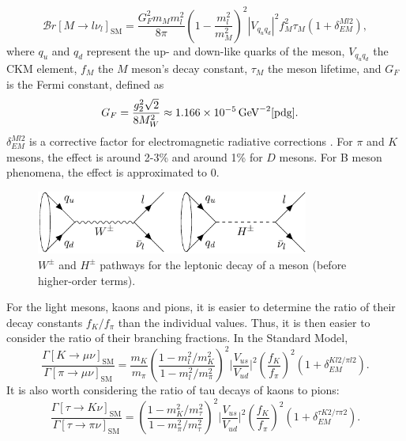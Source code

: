 \documentclass[a4paper,12pt]{article}
\begin{document}
\begin{equation}
    \label{eq:mlv}
    \mathcal{B}r[M\to l\nu_l]_{\text{SM}} = \frac{G_F^2m_Mm_l^2}{8\pi}\left(1-\frac{m_l^2}{m_M^2}\right)^2 |V_{q_uq_d}|^2f_M^2\tau_M(1+\delta_{EM}^{Ml2}),
\end{equation}
where $q_u$ and $q_d$ represent the up- and down-like quarks of the meson, $V_{q_uq_d}$ the CKM element, $f_M$ the $M$ meson's decay constant, $\tau_M$ the meson lifetime, and $G_F$ is the Fermi constant, defined as
\begin{align}
    G_F &= \frac{g_2^2\sqrt{2}}{8M_W^2} \approx 1.166\times10^{-5}\,\text{GeV}^{-2} \cite{pdg}.
\end{align}
$\delta_{EM}^{Ml2}$ is a corrective factor for electromagnetic radiative corrections \cite{pdg}. 
For $\pi$ and $K$ mesons, the effect is around 2-3\% and around 1\% for $D$ mesons.
For B meson phenomena, the effect is approximated to 0. 
\begin{figure}[ht]
    \centering
    \includegraphics[width=0.8\textwidth]{mesons.pdf}
    \caption{\label{fig:mesons}$W^\pm$ and $H^\pm$ pathways for the leptonic decay of a meson (before higher-order terms).}
\end{figure}
For the light mesons, kaons and pions, it is easier to determine the ratio of their decay constants $f_K/f_\pi$ than the individual values.
Thus, it is then easier to consider the ratio of their branching fractions. 
In the Standard Model, 
\begin{equation}
    \label{eq:kpi}
    \frac{\Gamma[K\to\mu\nu]_{\text{SM}}}{\Gamma[\pi\to\mu\nu]_{\text{SM}}} = \frac{m_K}{m_\pi}\left(\frac{1-m_l^2/m_K^2}{1-m_l^2/m_\pi^2}\right)^2 \bigg|\frac{V_{us}}{V_{ud}}\bigg|^2\left(\frac{f_K}{f_\pi}\right)^2(1+\delta^{Kl2/\pi l2}_{EM}).
\end{equation}
It is also worth considering the ratio of tau decays of kaons to pions:
\begin{equation}
    \label{ep:tkpi}
    \frac{\Gamma[\tau\to K\nu]_{\text{SM}}}{\Gamma[\tau\to\pi\nu]_{\text{SM}}} = \left(\frac{1-m_K^2/m_\tau^2}{1-m_\pi^2/m_\tau^2}\right)^2\bigg|\frac{V_{us}}{V_{ud}}\bigg|^2\left(\frac{f_K}{f_\pi}\right)^2(1+\delta_{EM}^{\tau K2/\tau\pi2}).
\end{equation}
\end{document}
